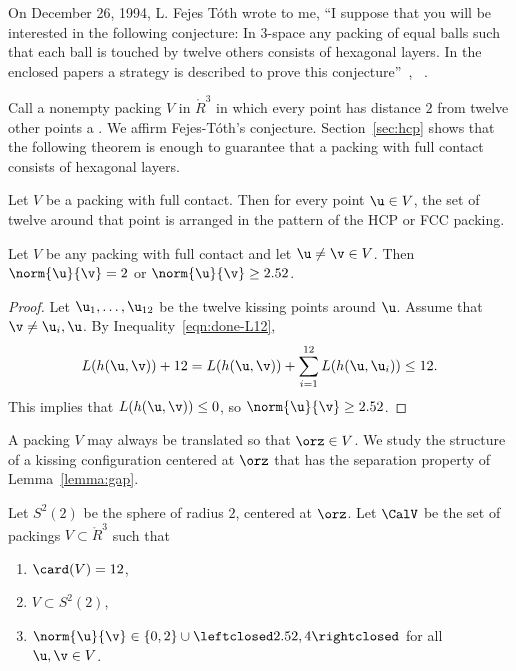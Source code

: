 On December 26, 1994, L. Fejes T\'oth wrote to me, ``I suppose that you will
be interested in the following conjecture: In $3$-space any packing of
equal balls such that each ball is touched by twelve others consists
of hexagonal layers.  In the enclosed papers a strategy is described
to prove this conjecture''~\cite{Fejes-Toth:89},
~\cite{Fejes-Toth:69}.

Call a nonempty packing $V$ in $\ring{R}^3$ in which every point has
distance $2$ from twelve other points a .  We affirm Fejes-T\'oth's conjecture.  
Section~\ref{sec:hcp} shows that the following theorem
is enough to guarantee that a packing with full contact consists of
hexagonal layers.  
%
%


\begin{theorem}\label{thm:fc} 
  Let $V$ be a packing with full contact.  Then for every point $\u\in
  V$, the set of twelve around that point is arranged in the pattern
  of the HCP or FCC packing.
\end{theorem}
%
%
%



\begin{lemma}[] \label{lemma:gap}
  Let $V$ be any packing with full contact and let $\u\ne\v\in V$.
  Then $\norm{\u}{\v}=2$ or $\norm{\u}{\v} \ge 2.52$.
\end{lemma}
%
%

\begin{proof} Let $ \u_1,\ldots, \u_{12}$ be the twelve kissing points
  around $\u$.  Assume that $\v\ne \u_i,\u$.  By
  Inequality~\ref{eqn:done-L12},
\[
   L(h( \u, \v))  + 12 
  =  L(h( \u, \v)) + \sum_{i=1}^{12} L(h( \u, \u_i))  \le 12.
\]
This implies that $L(h( \u, \v))\le 0$, so $\norm{ \u}{ \v}\ge 2.52$.
\end{proof}

A packing $V$ may always be translated so that $\orz\in V$.  We study
the structure of a kissing configuration centered at $\orz$ that
has the separation property of Lemma~\ref{lemma:gap}.

\begin{definition}[$S^2(2)$,~$\CalV$]
  Let $S^2(2)$ be the sphere of radius $2$, centered at $\orz$.  Let
  $\CalV$ be the set of packings $V\subset \ring{R}^3$ such that
\begin{enumerate}\wasitemize 
\item $\card(V) = 12$,
\item $V\subset S^2(2)$,
\item $\norm{\u}{\v} \in \{0,2\}\cup
  \leftclosed2.52,4\rightclosed$ for all $\u,\v\in V$.
\end{enumerate}\wasitemize 
{}%
%
\end{definition}

